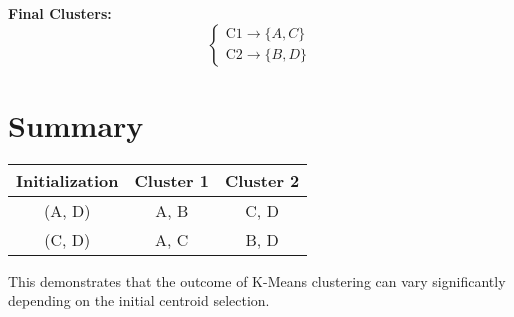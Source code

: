 \documentclass{article}
\begin{document}
\textbf{Final Clusters:}
\[
\begin{cases}
\text{C1} \rightarrow \{ A, C \} \\
\text{C2} \rightarrow \{ B, D \}
\end{cases}
\]

\section*{Summary}

\begin{center}
\begin{tabular}{ccc}
\toprule
Initialization & Cluster 1 & Cluster 2 \\
\midrule
(A, D) & A, B & C, D \\
(C, D) & A, C & B, D \\
\bottomrule
\end{tabular}
\end{center}

\noindent This demonstrates that the outcome of K-Means clustering can vary significantly depending on the initial centroid selection.
\end{document}
